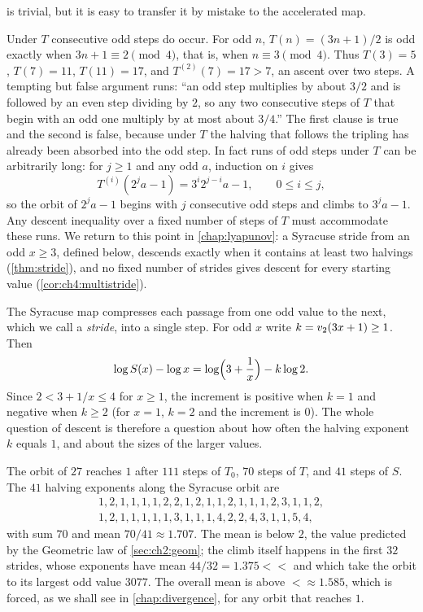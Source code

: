  is trivial, but it is easy to transfer it by mistake to the
accelerated map.

\begin{remark}\label{rem:ch2:pitfall}
Under $T$ consecutive odd steps do occur. For odd $n$, $T(n)=(3n+1)/2$ is odd
exactly when $3n+1\equiv2\pmod4$, that is, when $n\equiv3\pmod4$. Thus
$T(3)=5$, $T(7)=11$, $T(11)=17$, and $T^{(2)}(7)=17>7$, an ascent over two
steps. A tempting but false argument runs: ``an odd step multiplies by about
$3/2$ and is followed by an even step dividing by $2$, so any two consecutive
steps of $T$ that begin with an odd one multiply by at most about $3/4$.'' The
first clause is true and the second is false, because under $T$ the halving
that follows the tripling has already been absorbed into the odd step. In fact
runs of odd steps under $T$ can be arbitrarily long: for $j\geq1$ and any odd
$a$, induction on $i$ gives
\[
  T^{(i)}(2^j a-1)=3^i2^{j-i}a-1,\qquad 0\leq i\leq j,
\]
so the orbit of $2^ja-1$ begins with $j$ consecutive odd steps and climbs to
$3^ja-1$. Any descent inequality over a fixed number of steps of $T$ must
accommodate these runs.
We return to this point in \cref{chap:lyapunov}: a Syracuse stride from an odd $x\geq3$, defined below, descends exactly when it contains at least two halvings (\cref{thm:stride}), and no fixed number of strides gives descent for every starting value (\cref{cor:ch4:multistride}).
\end{remark}

The Syracuse map compresses each passage from one odd value to the next, which we call a \emph{stride}, into a single step.
For odd $x$ write $k=v_2(3x+1)\geq1$. Then
\begin{equation}\label{eq:ch2:stride}
  \log S(x)-\log x=\log\Bigl(3+\frac1x\Bigr)-k\log2 .
\end{equation}
Since $2<3+1/x\leq4$ for $x\geq1$, the increment is positive when $k=1$ and
negative when $k\geq2$ (for $x=1$, $k=2$ and the increment is $0$). The whole
question of descent is therefore a question about how often the halving
exponent $k$ equals $1$, and about the sizes of the larger values.

\begin{example}\label{ex:ch2:27}
The orbit of $27$ reaches $1$ after $111$ steps of $T_0$, $70$ steps of $T$,
and $41$ steps of $S$. The $41$ halving exponents along the Syracuse orbit are
\[
\begin{gathered}
  1,2,1,1,1,1,2,2,1,2,1,1,2,1,1,1,2,3,1,1,2,\\
  1,2,1,1,1,1,1,3,1,1,1,4,2,2,4,3,1,1,5,4,
\end{gathered}
\]
with sum $70$ and mean $70/41\approx1.707$.
The mean is below $2$, the value predicted by the Geometric law of \cref{sec:ch2:geom}; the climb itself happens in the first $32$ strides, whose exponents have mean $44/32=1.375<\lt$ and which take the orbit to its largest odd value $3077$.
The overall mean is above $\lt\approx1.585$, which is forced, as we shall see in \cref{chap:divergence}, for any orbit that reaches $1$.
\end{example}

